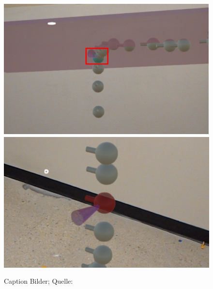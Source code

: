 \begin{figure}[H]
    \centering
    \includegraphics[scale=0.35]{Grafiken/beispielGrafiken/bild_1.PNG}
    \includegraphics[scale=0.35]{Grafiken/beispielGrafiken/bild_2.PNG}
    \caption{Caption Bilder; Quelle: \cite{trajektorienDemonstration}}
    \label{fig:bild_label}
\end{figure}

